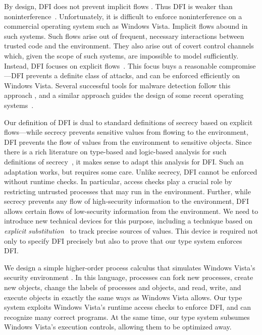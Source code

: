 \documentclass{sigplanconf}
\begin{document}
By design, DFI does not prevent implicit flows \cite{denningcert}. Thus DFI is weaker than noninterference~\cite{nonintf}.
Unfortunately, it is difficult to enforce noninterference on a commercial operating system such as Windows Vista. Implicit flows abound in such systems. Such
flows arise out of frequent, necessary interactions between trusted code
and the environment. They also arise out of covert control channels
which, given the scope of such systems, are impossible to model
sufficiently. Instead, DFI focuses on explicit flows~\cite{denningcert}. This focus buys a reasonable compromise---DFI prevents a definite class of attacks, and can be enforced efficiently on Windows Vista. Several successful tools for malware detection follow this approach  \cite{castro,panorama,suh,vogt,dytan,perl}, and a similar approach guides the design of some recent operating systems~\cite{asbestos,histar}. 








Our definition of DFI is dual to standard definitions of
secrecy based on explicit flows---while secrecy prevents sensitive values from
flowing to the environment, DFI prevents the flow of values from the environment to sensitive objects.  Since
there is a rich literature on type-based and logic-based analysis for such definitions of secrecy~\cite{secgp,sectyplog,runtimeprin,ChaudhuriConcur06}, it
makes sense to adapt this analysis for DFI. Such an adaptation works, but requires some care.
Unlike secrecy, DFI cannot be enforced without runtime checks. In particular, access checks play a crucial role by
restricting untrusted processes that may run in the environment.  
Further, while secrecy prevents any flow of high-security information to the environment,  
DFI allows certain flows of low-security information from the environment. We need to introduce new technical devices for this purpose, including a technique based on \emph{explicit
substitution}~\cite{abadi90explicit} to track precise sources of values. This device is required not only to
specify DFI precisely but also to prove that our type system
enforces DFI.


We design a simple higher-order process calculus that simulates Windows Vista's security environment \cite{bppvista,symantec,uac}. In this language,  processes can fork new processes, create new objects, change the labels of processes and objects, and read, write, and execute objects in exactly the same ways as Windows Vista allows. 
Our type system exploits Windows Vista's runtime access checks to enforce DFI, and can recognize many correct programs. At the same time, our type system subsumes Windows Vista's execution controls, allowing them to be optimized away.
\end{document}
